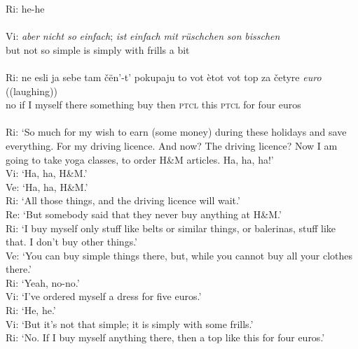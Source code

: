 \gll Ri: he-he\\
    {} {}\\

\gll Vi: \textit{aber} \textit{nicht} \textit{so} \textit{einfach}; \textit{ist} \textit{einfach} \textit{mit} \textit{rüschchen} \textit{so\textunderscore{}n} \textit{bisschen}\\
    {} but not so simple is simply with frills a bit\\
\glt \hfill \\

\gll Ri: ne esli ja sebe tam čën'-t' pokupaju to vot ètot vot top \phantom{nn} za četyre \textit{euro} ((laughing))\\
    {} no if I myself there something buy then \textsc{ptcl} this \textsc{ptcl} {} {} for four euros\\
\glt \hfill \\

Ri: `So much for my wish to earn (some money) during these holidays \phantom{mn} \phantom{mn} and save everything. For my driving licence. And now? The driving \phantom{mn} licence? Now I am going to take yoga classes, to order H{\&}M articles. \phantom{mn} Ha, ha, ha!'\\
Vi: `Ha, ha, H{\&}M.'\\
Ve: `Ha, ha, H{\&}M.'\\
Ri: `All those things, and the driving licence will wait.'\\
Re: `But somebody said that they never buy anything at H{\&}M.'\\
Ri: `I buy myself only stuff like belts or similar things, or balerinas, stuff \phantom{mn} like that. I don't buy other things.'\\
Ve: `You can buy simple things there, but, while you cannot buy all your \phantom{mn} clothes there.'\\
Ri: `Yeah, no-no.'\\
Vi: `I've ordered myself a dress for five euros.'\\
Ri: `He, he.'\\
Vi: `But it's not that simple; it is simply with some frills.'\\
Ri: `No. If I buy myself anything there, then a top like this for four euros.'
\z

